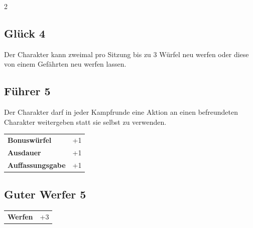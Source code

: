 \begin{multicols}{2}
\begin{tcolorbox}
\end{tcolorbox}

\begin{tcolorbox}
    \subsection*{Glück \hfill \small{4 }}
    \tcblower
Der Charakter kann zweimal pro Sitzung bis zu 3 Würfel neu werfen oder diese von einem Gefährten neu werfen lassen.


\vspace{3mm}



\end{tcolorbox}

\begin{tcolorbox}
    \subsection*{Führer \hfill \small{5 }}
    \tcblower
Der Charakter darf in jeder Kampfrunde eine Aktion an einen befreundeten Charakter weitergeben statt sie selbst zu verwenden.


\vspace{3mm}

\begin{tabular}{@{}ll@{}}
    \textbf{Bonuswürfel} & +1\\
    \textbf{Ausdauer} & +1\\
    \textbf{Auffassungsgabe} & +1\\
\end{tabular}


\end{tcolorbox}

\begin{tcolorbox}
    \subsection*{Guter Werfer \hfill \small{5 }}
    \tcblower




\begin{tabular}{@{}ll@{}}
    \textbf{Werfen} & +3\\
\end{tabular}


\end{tcolorbox}
\end{multicols}
